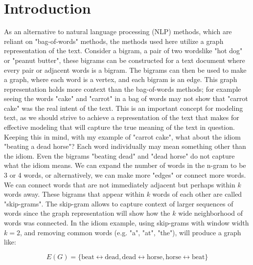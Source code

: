 %
%
%

\section{Introduction}

As an alternative to natural language processing (NLP) methods, which are reliant on "bag-of-words" methods, the methods used here utilize a graph representation of the text. Consider a bigram, a pair of two words\textemdash like "hot dog" or "peanut butter", these bigrams can be constructed for a text document where every pair or adjacent words is a bigram. The bigrams can then be used to make a graph, where each word is a vertex, and each bigram is an edge. This graph representation holds more context than the bag-of-words methods; for example seeing the words "cake" and "carrot" in a bag of words may not show that "carrot cake" was the real intent of the text. This is an important concept for modeling text, as we should strive to achieve a representation of the text that makes for effective modeling that will capture the true meaning of the text in question. Keeping this in mind, with my example of "carrot cake", what about the idiom "beating a dead horse"? Each word individually may mean something other than the idiom. Even the bigrams "beating dead" and "dead horse" do not capture what the idiom means. We can expand the number of words in the n-gram to be 3 or 4 words, or alternatively, we can make more "edges" or connect more words. We can connect words that are not immediately adjacent but perhaps within $k$ words away. These bigrams that appear within $k$ words of each other are called "skip-grams". The skip-gram allows to capture context of larger sequences of words since the graph representation will show how the $k$ wide neighborhood of words was connected. In the idiom example, using skip-grams with window width $k = 2$, and removing common words (e.g. "a", "at", "the"), will produce a graph like: 

$$
E(G) = \{
\text{beat}  \longleftrightarrow \text{dead}, 
\text{dead}  \longleftrightarrow \text{horse}, 
\text{horse}  \longleftrightarrow \text{beat} \}
$$

